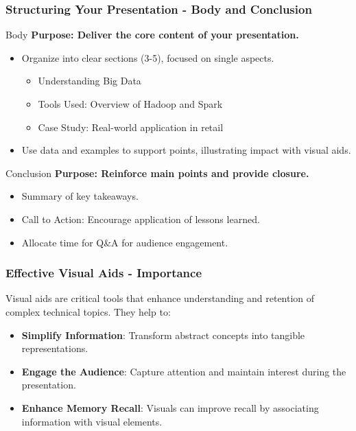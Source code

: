 \documentclass[aspectratio=169]{beamer}
\begin{document}
\begin{frame}[fragile]
  \frametitle{Structuring Your Presentation - Body and Conclusion}
  
  \begin{block}{Body}
    \textbf{Purpose: Deliver the core content of your presentation.}
  \end{block}
  
  \begin{itemize}
    \item Organize into clear sections (3-5), focused on single aspects.
    \begin{itemize}
      \item Understanding Big Data
      \item Tools Used: Overview of Hadoop and Spark
      \item Case Study: Real-world application in retail
    \end{itemize}
    \item Use data and examples to support points, illustrating impact with visual aids.
  \end{itemize}

  \begin{block}{Conclusion}
    \textbf{Purpose: Reinforce main points and provide closure.}
  \end{block}
  
  \begin{itemize}
    \item Summary of key takeaways. 
    \item Call to Action: Encourage application of lessons learned.
    \item Allocate time for Q\&A for audience engagement.
  \end{itemize}
\end{frame}

\begin{frame}[fragile]
    \frametitle{Effective Visual Aids - Importance}
    Visual aids are critical tools that enhance understanding and retention of complex technical topics. They help to:
    \begin{itemize}
        \item \textbf{Simplify Information}: Transform abstract concepts into tangible representations.
        \item \textbf{Engage the Audience}: Capture attention and maintain interest during the presentation.
        \item \textbf{Enhance Memory Recall}: Visuals can improve recall by associating information with visual elements.
    \end{itemize}
\end{frame}
\end{document}
